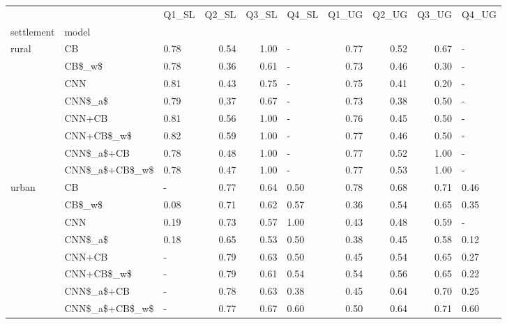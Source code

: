 \begin{tabular}{lllrrlrrrl}
\toprule
      &                & Q1\_SL &  Q2\_SL &  Q3\_SL & Q4\_SL &  Q1\_UG &  Q2\_UG &  Q3\_UG & Q4\_UG \\
settlement & model &       &        &        &       &        &        &        &       \\
\midrule
rural & CB &  0.78 &   0.54 &   1.00 &     - &   0.77 &   0.52 &   0.67 &     - \\
      & CB\$\_w\$ &  0.78 &   0.36 &   0.61 &     - &   0.73 &   0.46 &   0.30 &     - \\
      & CNN &  0.81 &   0.43 &   0.75 &     - &   0.75 &   0.41 &   0.20 &     - \\
      & CNN\$\_a\$ &  0.79 &   0.37 &   0.67 &     - &   0.73 &   0.38 &   0.50 &     - \\
      & CNN+CB &  0.81 &   0.56 &   1.00 &     - &   0.76 &   0.45 &   0.50 &     - \\
      & CNN+CB\$\_w\$ &  0.82 &   0.59 &   1.00 &     - &   0.77 &   0.46 &   0.50 &     - \\
      & CNN\$\_a\$+CB &  0.78 &   0.48 &   1.00 &     - &   0.77 &   0.52 &   1.00 &     - \\
      & CNN\$\_a\$+CB\$\_w\$ &  0.78 &   0.47 &   1.00 &     - &   0.77 &   0.53 &   1.00 &     - \\
urban & CB &     - &   0.77 &   0.64 &  0.50 &   0.78 &   0.68 &   0.71 &  0.46 \\
      & CB\$\_w\$ &  0.08 &   0.71 &   0.62 &  0.57 &   0.36 &   0.54 &   0.65 &  0.35 \\
      & CNN &  0.19 &   0.73 &   0.57 &  1.00 &   0.43 &   0.48 &   0.59 &     - \\
      & CNN\$\_a\$ &  0.18 &   0.65 &   0.53 &  0.50 &   0.38 &   0.45 &   0.58 &  0.12 \\
      & CNN+CB &     - &   0.79 &   0.63 &  0.50 &   0.45 &   0.54 &   0.65 &  0.27 \\
      & CNN+CB\$\_w\$ &     - &   0.79 &   0.61 &  0.54 &   0.54 &   0.56 &   0.65 &  0.22 \\
      & CNN\$\_a\$+CB &     - &   0.78 &   0.63 &  0.38 &   0.45 &   0.64 &   0.70 &  0.25 \\
      & CNN\$\_a\$+CB\$\_w\$ &     - &   0.77 &   0.67 &  0.60 &   0.50 &   0.64 &   0.71 &  0.60 \\
\bottomrule
\end{tabular}
